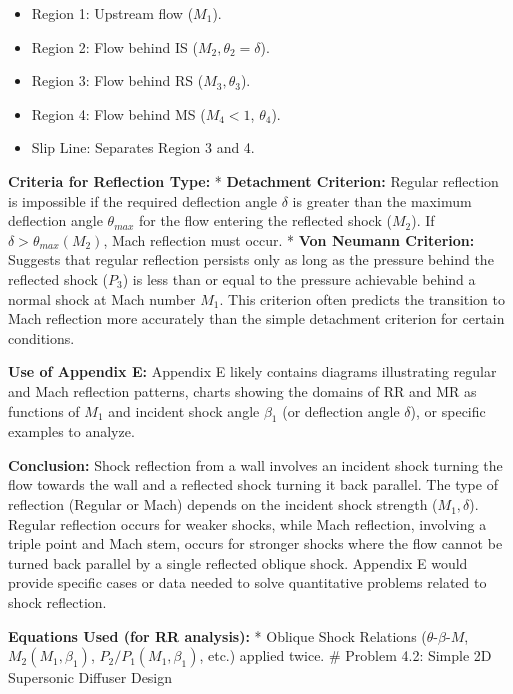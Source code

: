 \begin{itemize}
\begin{itemize}
    \begin{itemize}
    \tightlist
    \item
      Region 1: Upstream flow (\(M_1\)).
    \item
      Region 2: Flow behind IS (\(M_2, \theta_2=\delta\)).
    \item
      Region 3: Flow behind RS (\(M_3, \theta_3\)).
    \item
      Region 4: Flow behind MS (\(M_4 < 1\), \(\theta_4\)).
    \item
      Slip Line: Separates Region 3 and 4.
    \end{itemize}
  \end{itemize}
\end{itemize}

\textbf{Criteria for Reflection Type:} * \textbf{Detachment Criterion:}
Regular reflection is impossible if the required deflection angle
\(\delta\) is greater than the maximum deflection angle \(\theta_{max}\)
for the flow entering the reflected shock (\(M_2\)). If
\(\delta > \theta_{max}(M_2)\), Mach reflection must occur. *
\textbf{Von Neumann Criterion:} Suggests that regular reflection
persists only as long as the pressure behind the reflected shock
(\(P_3\)) is less than or equal to the pressure achievable behind a
normal shock at Mach number \(M_1\). This criterion often predicts the
transition to Mach reflection more accurately than the simple detachment
criterion for certain conditions.

\textbf{Use of Appendix E:} Appendix E likely contains diagrams
illustrating regular and Mach reflection patterns, charts showing the
domains of RR and MR as functions of \(M_1\) and incident shock angle
\(\beta_1\) (or deflection angle \(\delta\)), or specific examples to
analyze.

\textbf{Conclusion:} Shock reflection from a wall involves an incident
shock turning the flow towards the wall and a reflected shock turning it
back parallel. The type of reflection (Regular or Mach) depends on the
incident shock strength (\(M_1, \delta\)). Regular reflection occurs for
weaker shocks, while Mach reflection, involving a triple point and Mach
stem, occurs for stronger shocks where the flow cannot be turned back
parallel by a single reflected oblique shock. Appendix E would provide
specific cases or data needed to solve quantitative problems related to
shock reflection.

\textbf{Equations Used (for RR analysis):} * Oblique Shock Relations
(\(\theta\)-\(\beta\)-\(M\), \(M_2(M_1, \beta_1)\),
\(P_2/P_1(M_1, \beta_1)\), etc.) applied twice. \# Problem 4.2: Simple
2D Supersonic Diffuser Design

